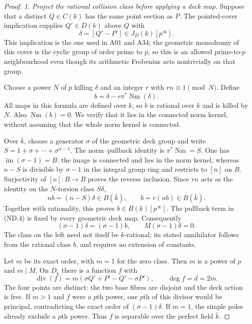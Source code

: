 \begin{proof}
\emph{1. Project the rational collision class before applying a deck map.}
Suppose that a distinct $Q\in C(k)$ has the same point section as
$P$. The pointed-cover implication supplies $Q'\in D(k)$ above
$Q$ with
\[
                       \delta=[Q'-P']\in J_D(k)[p^\infty].
 \tag{ND.3}
\]
This implication is the one used in A01 and A34; the geometric
monodromy of this cover is the cyclic group of order prime to $p$, so this is an
allowed prime-to-$p$ neighbourhood even though its arithmetic
Frobenius acts nontrivially on that group.

Choose a power $N$ of $p$ killing $\delta$ and an integer $r$
with $rn\equiv1\pmod N$. Define
\[
                b=\delta-r\pi^*\operatorname{Nm}(\delta).
 \tag{ND.4}
\]
All maps in this formula are defined over $k$, so $b$ is rational
over $k$ and is killed by $N$. Also $\operatorname{Nm}(b)=0$.
We verify that it lies in the connected norm kernel, without
assuming that the whole norm kernel is connected.

Over $\bar k$, choose a generator $\sigma$ of the geometric deck
group and write $S=1+\sigma+\cdots+\sigma^{n-1}$.
The norm--pullback identity is $\pi^*\operatorname{Nm}=S$.
One has $\operatorname{im}(\sigma-1)=B$: the image is connected
and lies in the norm kernel, whereas $n-S$ is divisible by
$\sigma-1$ in the integral group ring and restricts to $[n]$ on
$B$. Surjectivity of $[n]:B\to B$ proves the reverse inclusion.
Since $rn$ acts as the identity on the $N$-torsion class $S\delta$,
\[
             nb=(n-S)\delta\in B(\bar k),\qquad b=r(nb)\in B(\bar k).
 \tag{ND.5}
\]
Together with rationality, this proves $b\in B(k)[p^\infty]$.
The pullback term in (ND.4) is fixed by every geometric deck map.
Consequently
\[
              (\sigma-1)\delta=(\sigma-1)b,
              \qquad M(\sigma-1)\delta=0.
 \tag{ND.6}
\]
The class on the left need not itself be $k$-rational; its stated
annihilator follows from the rational class $b$, and requires no
extension of constants.

Let $m$ be its exact order, with $m=1$ for the zero class. Then
$m$ is a power of $p$ and $m\mid M$. On $D_{\bar k}$ there is a
function $f$ with
\[
 \operatorname{div}(f)
       =m(\sigma Q'+P'-Q'-\sigma P'),\qquad \deg f=d=2m.
 \tag{ND.7}
\]
The four points are distinct: the two base fibres are disjoint
and the deck action is free. If $m>1$ and $f$ were a $p$th power,
one $p$th of this divisor would be principal, contradicting the exact
order of $(\sigma-1)\delta$. If $m=1$, the simple poles already
exclude a $p$th power. Thus $f$ is separable over the perfect field
$\bar k$.


\end{proof}
